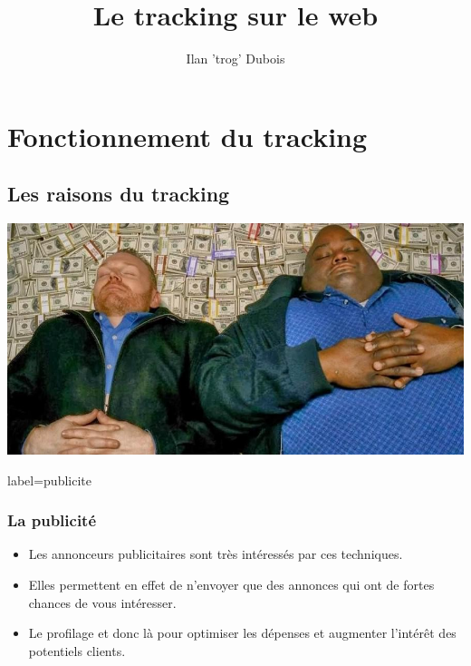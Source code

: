 \documentclass{beamer}
\title{Le tracking sur le web}
\author{Ilan 'trog' Dubois}
\begin{document}
    \begin{frame}
        \titlepage
    \end{frame}
    \section{Fonctionnement du tracking}
    \subsection{Les raisons du tracking}
        \begin{frame}
            \begin{center}
                \includegraphics[scale=0.35]{img/money.jpg}
            \end{center}
        \end{frame}
        \begin{frame}{label=publicite}
            \frametitle{La publicité}
            \begin{center}
                \begin{itemize}
                    \item Les annonceurs publicitaires sont très intéressés par ces techniques.
                    \pause
                    \item Elles permettent en effet de n'envoyer que des annonces qui ont de fortes chances de vous intéresser.
                    \pause
                    \item Le profilage et donc là pour optimiser les dépenses et augmenter l'intérêt des potentiels clients.
                \end{itemize}
            \end{center}
        \end{frame}
\end{document}

